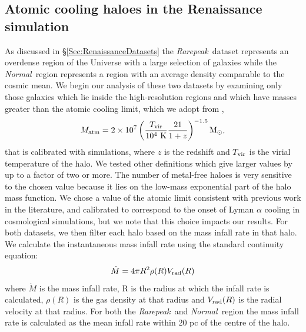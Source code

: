 \documentclass[graphics, twocolumn, usenatbib]{mn2e}
\newcommand{\rarepeak} {\textit{Rarepeak~}}
\newcommand{\normal} {\textit{Normal~}}
\begin{document}
\subsection{Atomic cooling haloes in the Renaissance simulation}

As discussed in \S \ref{Sec:RenaissanceDatasets} the \rarepeak dataset represents an overdense
region of the Universe with a large selection of galaxies while the \normal region represents a
region with an average density comparable to the cosmic mean. We begin our analysis of these two
datasets by examining only those galaxies which lie inside the high-resolution regions and which
have masses greater than the atomic cooling limit, which we adopt from \cite{Fernandez_2014},
%
\begin{equation}
  M_{\rm atm} = 2 \times 10^{7} \left( \frac{{T_{\rm vir}}}{10^4~{\rm K}}  \frac{21}{1+z} \right)^{-1.5} \rm{M_{\odot}},
\end{equation}
%
that is calibrated with simulations, where $z$ is the redshift and $T_{\rm vir}$ is the virial temperature of the halo. 
We tested other definitions \citep[e.g.][]{Bromm_2011} which give larger
values by up to a factor of two or more. The number of metal-free haloes
is very sensitive to the chosen value because it lies on the low-mass exponential part of the halo mass function.
We chose a value of the atomic limit consistent with previous work in the literature, and
calibrated to correspond to the onset of Lyman $\alpha$ cooling in cosmological simulations,
but we note that this choice impacts our results.
For both datasets, we then filter each halo based on the mass infall rate in that halo.
We calculate the instantaneous mass infall rate using the standard continuity equation:
\begin{equation}  
  \dot{M} = 4 \pi R^2 \rho(R) V_{\rm rad}(R)
\end{equation}
where  $\dot{M}$ is the mass infall rate, R is the radius at which the infall rate is calculated,
$\rho(R)$ is the gas density at that radius and $V_{\rm rad}(R)$ is the radial velocity at that radius.
For both the \rarepeak and \normal region the mass infall rate is calculated as the mean
infall rate within 20 pc of the centre of the halo. 
\end{document}
